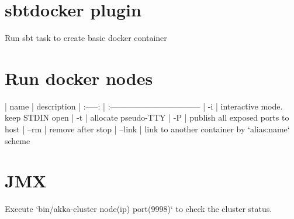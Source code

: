 \section*{sbt\-docker plugin}

Run sbt task to create basic docker container

\section*{Run docker nodes}

| name    | description
| :-----: | :---------------------------------
| -i      | interactive mode. keep STDIN open
| -t      | allocate pseudo-TTY
| -P      | publish all exposed ports to host
| --rm    | remove after stop
| --link  | link to another container by `alias:name` scheme

\section*{JMX}

Execute `bin/akka-cluster node(ip) port(9998)` to check the cluster status.
